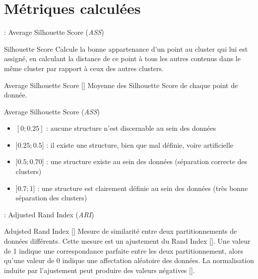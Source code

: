 \documentclass[svgnames]{beamer}
\newcommand{\mycite}[1]{[\textit{\cite{#1}}]}
\begin{document}
	\section{Métriques calculées}
	\begin{frame}{\secname : Average Silhouette Score (\textit{ASS})}
		\begin{block}{Silhouette Score}
			Calcule la bonne appartenance d'un point au cluster qui lui est assigné, en calculant la distance de ce point à tous les autres contenus dans le même cluster par rapport à ceux des autres clusters.
		\end{block}
		
		\begin{block}{Average Silhouette Score \mycite{Rousseeuw1987Sag}}
			Moyenne des Silhouette Score de chaque point de donnée.
		\end{block}
	\end{frame}
	
	\begin{frame}{Average Silhouette Score (\textit{ASS})}
		\begin{itemize}[label=$\bullet$]
			\item $[0;0.25]$ : aucune structure n’est discernable au sein des données
			\item$ ]0.25; 0.5]$ : il existe une structure, bien que mal définie, voire artificielle
			\item $]0.5;0.70
			]$ : une structure existe au sein des données (séparation correcte des clusters)
			\item $]0.7;1]$ : une structure est clairement définie au sein des données (très bonne séparation des clusters)
		\end{itemize}
	\end{frame}
	
	\begin{frame}{\secname : Adjusted Rand Index (\textit{ARI})}
		\begin{block}{Adujsted Rand Index \mycite{Morey1984ARI}}
			Mesure de similarité entre deux partitionnements de données différents. Cette mesure est un ajustement du Rand Index \mycite{Rand2971RI}. Une valeur de 1 indique une correspondance parfaite entre les deux partitionnement, alors qu'une valeur de 0 indique une affectation aléatoire des données. La normalisation induite par l'ajustement peut produire des valeurs négatives \mycite{Meila2007Cca}. 
		\end{block}
	\end{frame}
\end{document}
